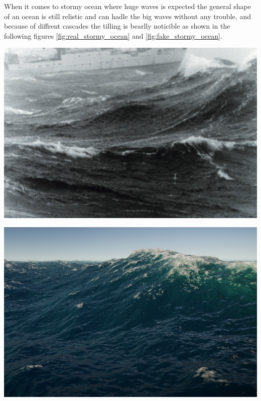 When it comes to stormy ocean where huge waves is expected the general shape of an ocean is still relistic
and can hadle the big waves without any trouble, and because of diffrent cascades the tilling is bearlly noticible as shown in the following figures \ref{fig:real_stormy_ocean} and \ref{fig:fake_stormy_ocean}.

\begin{minipage}[t]{0.48\textwidth}
    \centering
    \includegraphics[width=1\textwidth]{"images/real_stormy_ocean.png"}
    \captionsetup{justification=centering}
    \label{fig:real_stormy_ocean}
\end{minipage}
\hfill
\begin{minipage}[t]{0.48\textwidth}
    \centering
    \includegraphics[width=1\textwidth]{"images/fake_stormy_ocean.png"}
    \label{fig:fake_stormy_ocean}
\end{minipage}

